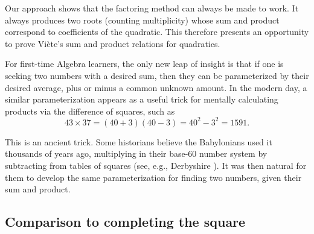 \documentclass[11pt]{article}
\begin{document}
Our approach shows that the factoring method can always be made to work. It
always produces two roots (counting multiplicity) whose sum and product
correspond to coefficients of the quadratic. This therefore presents an
opportunity to prove Vi\`ete's sum and product relations for quadratics.

For first-time Algebra learners, the only new leap of insight is that if one is
seeking two numbers with a desired sum, then they can be parameterized by their
desired average, plus or minus a common unknown amount. In the modern day, a
similar parameterization appears as a useful trick for mentally calculating
products via the difference of squares, such as
\begin{displaymath}
  43 \times 37 = (40 + 3)(40 - 3) = 40^2 - 3^2 = 1591.
\end{displaymath}

This is an ancient trick. Some historians believe the Babylonians used it
thousands of years ago, multiplying in their base-60 number system by
subtracting from tables of squares (see, e.g., Derbyshire
\cite{derbyshire}). It was then natural for them to develop the same
parameterization for finding two numbers, given their sum and product.



\subsection{Comparison to completing the square}
\end{document}

